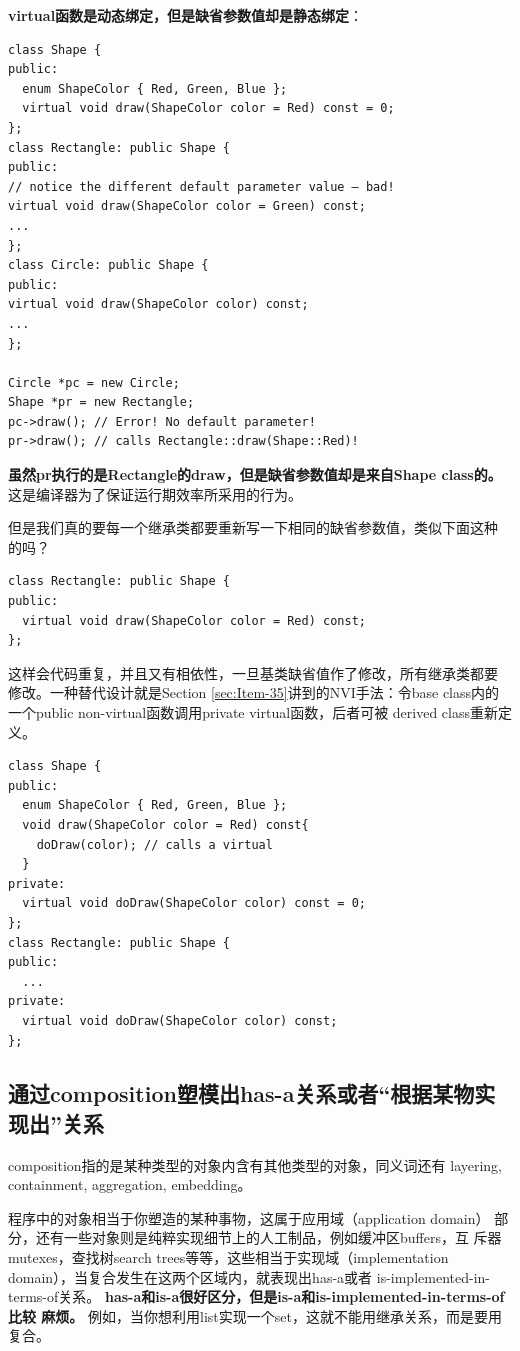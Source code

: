 \textbf{virtual函数是动态绑定，但是缺省参数值却是静态绑定}：
\begin{verbatim}
class Shape {
public:
  enum ShapeColor { Red, Green, Blue };
  virtual void draw(ShapeColor color = Red) const = 0;
};
class Rectangle: public Shape {
public:
// notice the different default parameter value — bad!
virtual void draw(ShapeColor color = Green) const;
...
};
class Circle: public Shape {
public:
virtual void draw(ShapeColor color) const;
...
};

Circle *pc = new Circle; 
Shape *pr = new Rectangle;
pc->draw(); // Error! No default parameter!
pr->draw(); // calls Rectangle::draw(Shape::Red)!
\end{verbatim}
\textbf{虽然pr执行的是Rectangle的draw，但是缺省参数值却是来自Shape
  class的。}这是编译器为了保证运行期效率所采用的行为。

但是我们真的要每一个继承类都要重新写一下相同的缺省参数值，类似下面这种
的吗？
\begin{verbatim}
class Rectangle: public Shape {
public:
  virtual void draw(ShapeColor color = Red) const;
};
\end{verbatim}
这样会代码重复，并且又有相依性，一旦基类缺省值作了修改，所有继承类都要
修改。一种替代设计就是Section \ref{sec:Item-35}讲到的NVI手法：令base
class内的一个public non-virtual函数调用private virtual函数，后者可被
derived class重新定义。
\begin{verbatim}
class Shape {
public:
  enum ShapeColor { Red, Green, Blue };
  void draw(ShapeColor color = Red) const{
    doDraw(color); // calls a virtual
  }
private:
  virtual void doDraw(ShapeColor color) const = 0; 
};
class Rectangle: public Shape {
public:
  ...
private:
  virtual void doDraw(ShapeColor color) const;
};
\end{verbatim}

\subsection{通过composition塑模出has-a关系或者“根据某物实现出”关系}
\label{sec:Item-38}

composition指的是某种类型的对象内含有其他类型的对象，同义词还有
layering, containment, aggregation, embedding。

程序中的对象相当于你塑造的某种事物，这属于应用域（application domain）
部分，还有一些对象则是纯粹实现细节上的人工制品，例如缓冲区buffers，互
斥器mutexes，查找树search trees等等，这些相当于实现域（implementation
domain），当复合发生在这两个区域内，就表现出has-a或者
is-implemented-in-terms-of关系。
\textbf{has-a和is-a很好区分，但是is-a和is-implemented-in-terms-of比较
  麻烦。}
例如，当你想利用list实现一个set，这就不能用继承关系，而是要用复合。


